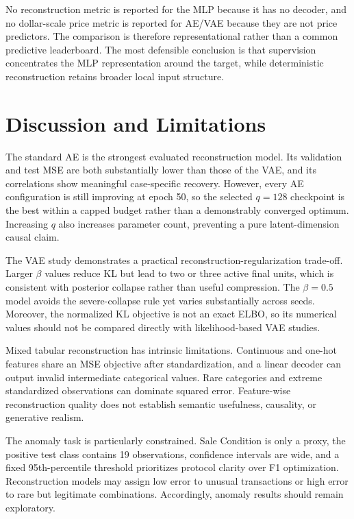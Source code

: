 \documentclass[11pt,letterpaper]{article}
\begin{document}
No reconstruction metric is reported for the MLP because it has no decoder, and no dollar-scale price metric is reported for AE/VAE because they are not price predictors. The comparison is therefore representational rather than a common predictive leaderboard. The most defensible conclusion is that supervision concentrates the MLP representation around the target, while deterministic reconstruction retains broader local input structure.

\section{Discussion and Limitations}
The standard AE is the strongest evaluated reconstruction model. Its validation and test MSE are both substantially lower than those of the VAE, and its correlations show meaningful case-specific recovery. However, every AE configuration is still improving at epoch 50, so the selected $q=128$ checkpoint is the best within a capped budget rather than a demonstrably converged optimum. Increasing $q$ also increases parameter count, preventing a pure latent-dimension causal claim.

The VAE study demonstrates a practical reconstruction-regularization trade-off. Larger $\beta$ values reduce KL but lead to two or three active final units, which is consistent with posterior collapse rather than useful compression. The $\beta=0.5$ model avoids the severe-collapse rule yet varies substantially across seeds. Moreover, the normalized KL objective is not an exact ELBO, so its numerical values should not be compared directly with likelihood-based VAE studies.

Mixed tabular reconstruction has intrinsic limitations. Continuous and one-hot features share an MSE objective after standardization, and a linear decoder can output invalid intermediate categorical values. Rare categories and extreme standardized observations can dominate squared error. Feature-wise reconstruction quality does not establish semantic usefulness, causality, or generative realism.

The anomaly task is particularly constrained. Sale Condition is only a proxy, the positive test class contains 19 observations, confidence intervals are wide, and a fixed 95th-percentile threshold prioritizes protocol clarity over F1 optimization. Reconstruction models may assign low error to unusual transactions or high error to rare but legitimate combinations. Accordingly, anomaly results should remain exploratory.
\end{document}
